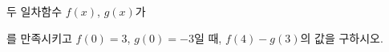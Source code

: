 두 일차함수 $f(x)$, $g(x)$가 \par\smallskip{}\par\smallskip\noindent 를 만족시키고 $f(0)=3$, $g(0)=-3$일 때, $f(4)-g(3)$의 값을 구하시오.
